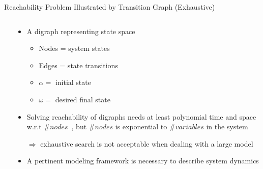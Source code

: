 \begin{frame}{Reachability Problem Illustrated by Transition Graph (Exhaustive)}

\begin{columns}
\begin{column}{0.5\textwidth}
\centering
    
\end{column}
\begin{column}{0.5\textwidth}
\begin{itemize}
    \item A digraph representing state space
    \begin{itemize}
        \item Nodes = system states
        \item Edges = state transitions
        \item $\alpha=$ initial state
        \item $\omega=$ desired final state
    \end{itemize}
    \item<5->Solving reachability of digraphs needs at least polynomial time and space w.r.t $\#nodes$~\cite{harel2002complexity}, but $\#nodes$ is exponential to $\#variables$ in the system

    $\Longrightarrow$ exhaustive search is not acceptable when dealing with a large model
    \item <6-> A pertinent modeling framework is necessary to describe system dynamics
\end{itemize}
\end{column}
\end{columns}
\end{frame}